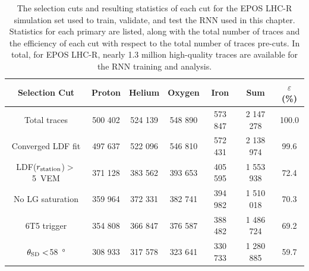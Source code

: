 \begin{table}
    \caption[Statistical summary of the selection cuts to the RNN input dataset.]{The selection cuts and resulting statistics of each cut for the EPOS LHC-R simulation set used to train, validate, and test the RNN used in this chapter. Statistics for each primary are listed, along with the total number of traces and the efficiency of each cut with respect to the total number of traces pre-cuts. In total, for EPOS LHC-R, nearly 1.3 million high-quality traces are available for the RNN training and analysis.}
    \label{tab:cuts}
    \vspace*{.5\baselineskip}
    \centering
    \begin{tabular}{| c || c | c | c | c || c | c |}
        \hline
        Selection Cut                         & Proton  & Helium  & Oxygen  & Iron    & Sum       & $\varepsilon$ (\%)\\
        \hline
        \hline
        Total traces                          & 500 402 & 524 139 & 548 890 & 573 847 & 2 147 278 & 100.0\\
        Converged LDF fit                     & 497 637 & 522 096 & 546 810 & 572 431 & 2 138 974 &  99.6\\
        LDF($r_{\rm station}$)$>$\qty{5}{VEM} & 371 128 & 383 562 & 393 653 & 405 595 & 1 553 938 &  72.4\\
        No LG saturation                      & 359 964 & 372 331 & 382 741 & 394 982 & 1 510 018 &  70.3\\
        6T5 trigger                           & 354 808 & 366 847 & 376 587 & 388 482 & 1 486 724 &  69.2\\
        $\theta_{\rm SD}<$\qty{58}{\degree}   & 308 933 & 317 578 & 323 641 & 330 733 & 1 280 885 &  59.7\\
        \hline
    \end{tabular}
\end{table}







